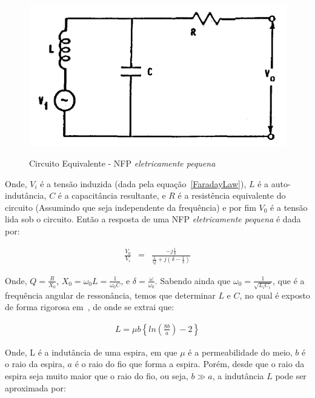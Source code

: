 \begin{figure}[htb!]
	\centering 
	\caption{Circuito Equivalente - NFP \textit{eletricamente pequena}}
	\includegraphics[scale=0.6]{./img/circuitEQ}
	\label{fig:circuitEQ}
\end{figure}

Onde, $V_i$ é a tensão induzida (dada pela equação~\ref{FaradayLaw}), $L$ é a auto-indutância, $C$ é a capacitância resultante, e $R$ é a resistência equivalente do circuito (Assumindo que seja independente da frequência) e por fim $V_0$ é a tensão lida sob o circuito. Então a resposta de uma NFP \textit{eletricamente pequena} é dada por:

\begin{eqnarray}
\frac{V_0}{V_i} &=& \frac{-j \frac{1}{\delta }}{\frac{1}{Q} + j \left (\delta - \frac{1}{\delta} \right )} \label{VoVi}
\end{eqnarray}

Onde, $Q = \frac{R}{X_0}$, $X_0 = \omega_0L = \frac{1}{\omega_0C}$, e $\delta = \frac{\omega}{\omega_0}$. Sabendo ainda que $\omega_0 = \frac{1}{\sqrt{L_{i}C_{i}}}$, que é a frequência angular de ressonância, temos que determinar $L$ e $C$, no qual é exposto de forma rigorosa em~, de onde se extrai que:

\begin{eqnarray}
L = \mu b \left \{ln \left ( \frac{8b}{a}  \right ) -2  \right \} \nonumber
\end{eqnarray}

Onde, L é a indutância de uma espira, em que $\mu$ é a permeabilidade do meio, $b$ é o raio da espira, $a$ é o raio do fio que forma a espira. Porém, desde que o raio da espira seja muito maior que o raio do fio, ou seja, $b \gg a$, a indutância $L$ pode ser aproximada por: 

